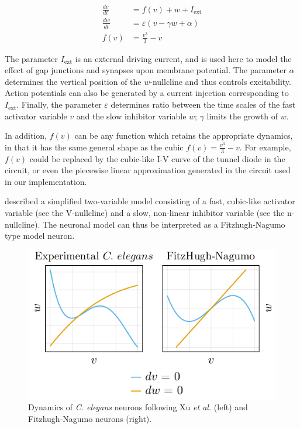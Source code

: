 \documentclass[
    11pt,
]{article}
\begin{document}
\begin{equation}
    \label{eq: fhn}
    \begin{aligned}
        \frac{dv}{dt} &= f(v) + w + I_\mathrm{ext}\\
        \frac{dw}{dt} &= \varepsilon(v - \gamma w + \alpha)\\
        f(v) &= \frac{v^3}{3} - v
    \end{aligned}
\end{equation}

The parameter $I_\mathrm{ext}$ is an external driving current, and is used here to model the effect of gap junctions and synapses upon membrane potential.  The parameter $\alpha$ determines the vertical position of the $w$-nullcline and thus controls excitability. Action potentials can also be generated by a current injection corresponding to $I_\mathrm{ext}$. Finally, the parameter $\varepsilon$ determines ratio between the time scales of the fast activator variable $v$ and the slow inhibitor variable $w$; $\gamma$ limits the growth of $w$.

In addition, $f(v)$ can be any function which retains the appropriate dynamics, in that it has the same general shape as the cubic $f(v) = \frac{v^3}{3} - v$.  For example, $f(v)$ could be replaced by the cubic-like I-V curve of the tunnel diode in the \citet{nagumo1962} circuit, or even the piecewise linear approximation generated in the \citet{keener1983} circuit used in our implementation.

\citet{xu2018} described a simplified two-variable model consisting of a fast, cubic-like activator variable (see the V-nullcline) and a slow, non-linear inhibitor variable (see the n-nullcline). The \citet{xu2018} neuronal model can thus be interpreted as a Fitzhugh-Nagumo type model neuron.

\begin{figure}[h!]
    \label{fig: nm nullclines}
    \centering
    \includegraphics{figures/neuron_dynamics/neuron_dynamics.pdf}
    \caption{Dynamics of \textit{C. elegans} neurons following Xu \textit{et al.} \cite{xu2018} (left) and Fitzhugh-Nagumo neurons \cite{fitzhugh1955, nagumo1962} (right).}
\end{figure}
\end{document}
